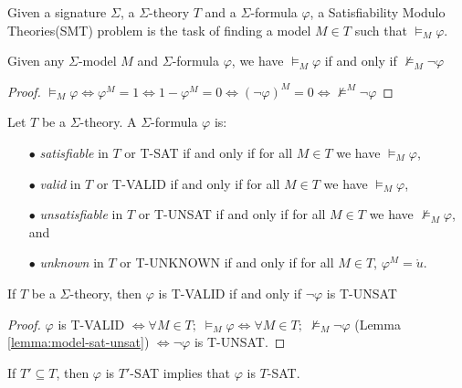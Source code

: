 Given a signature $\Sigma$, a $\Sigma$-theory $T$ and a $\Sigma$-formula $\varphi$, a Satisfiability Modulo Theories(SMT) problem is the task of finding a model $M \in T$ such that $\models_M \varphi$.

\begin{lemma}\label{lemma:model-sat-unsat}
Given any $\Sigma$-model $M$ and $\Sigma$-formula $\varphi$, we have $\models_M \varphi $ if and only if $ \not\models_M \neg \varphi$
\end{lemma}

\begin{proof}
$\models_M \varphi \iff \varphi^M = 1 \iff 1 - \varphi^M = 0 \iff (\neg \varphi)^M = 0 \iff \not\models^M \neg \varphi$
\end{proof}

\begin{definition}
Let $T$ be a $\Sigma$-theory. A $\Sigma$-formula $\varphi$ is:
\begin{itemize}
\item[$\bullet$] \emph{satisfiable} in $T$ or T-SAT if and only if for all $M \in T$ we have $\models_{M} \varphi$,
\item[$\bullet$] \emph{valid} in $T$ or T-VALID if and only if for all $M \in T$ we have $\models_{M} \varphi$,
\item[$\bullet$] \emph{unsatisfiable} in $T$ or T-UNSAT if and only if for all $M \in T$ we have $\not\models_{M} \varphi$, and
\item[$\bullet$] \emph{unknown} in $T$ or T-UNKNOWN if and only if for all $M \in T$, $\varphi^M = \mathring{u}$.
\end{itemize}
\end{definition}

\begin{lemma} \label{lemma:theory-valid-unsat}
If $T$ be a $\Sigma$-theory, then $\varphi$ is T-VALID if and only if $\neg\varphi$ is T-UNSAT
\end{lemma}

\begin{proof}
$\varphi$ is T-VALID $\iff \forall M \in T; \; \models_{M} \varphi \iff \forall M \in T; \; \not\models_{M} \neg\varphi$ (Lemma \ref{lemma:model-sat-unsat}) $\iff \neg\varphi$ is T-UNSAT.
\end{proof}

\begin{lemma} \label{lemma:subtheory-SAT}
If $T' \subseteq T$, then $\varphi$ is $T'$-SAT implies that $\varphi$ is $T$-SAT.
\end{lemma}

